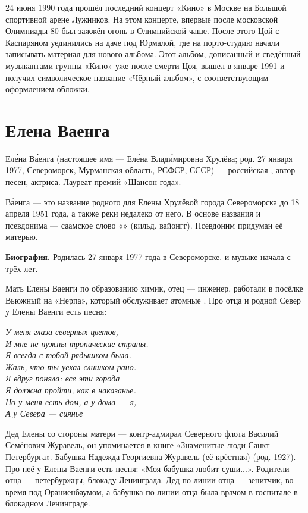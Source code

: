 24 июня 1990 года прошёл последний концерт «Кино» в Москве на Большой спортивной арене Лужников. На этом концерте, впервые после московской Олимпиады-80 был зажжён огонь в Олимпийской чаше. После этого Цой с Каспаряном уединились на даче под Юрмалой, где на порто-студию начали записывать материал для нового альбома. Этот альбом, дописанный и сведённый музыкантами группы «Кино» уже после смерти Цоя, вышел в январе 1991 и получил символическое название «Чёрный альбом», с соответствующим оформлением обложки.

\newpage
\section{Елена Ваенга}
Ел\'{е}на В\'{а}енга (настоящее имя --- Ел\'{е}на Влад\'{и}мировна Хрулёва; род. 27 января 1977, Североморск, Мурманская область, РСФСР, СССР) --- российская , автор песен, актриса. Лауреат премий «Шансон года».

В\'{а}енга --- это название родного для Елены Хрулёвой города Североморска до 18 апреля 1951 года, а также реки недалеко от него. В основе названия и псевдонима --- саамское слово «» (кильд. вайонгг). Псевдоним придуман её матерью.

\textbf{Биография.} Родилась 27 января 1977 года в Североморске.  и  музыке начала с трёх лет.

Мать Елены Ваенги по образованию химик, отец --- инженер, работали в посёлке Вьюжный на  «Нерпа», который обслуживает атомные . Про отца и родной Север у Елены Ваенги есть песня:

{\it У меня глаза северных цветов,\\
И мне не нужны тропические страны.\\
Я всегда с тобой рядышком была.\\
Жаль, что ты уехал слишком рано.\\
Я вдруг поняла: все эти города\\
Я должна пройти, как в наказанье.\\
Но у меня есть дом, а у дома --- я,\\
А у Севера --- сиянье}

Дед Елены со стороны матери --- контр-адмирал Северного флота Василий Семёнович Журавель, он упоминается в книге «Знаменитые люди Санкт-Петербурга». Бабушка Надежда Георгиевна Журавель (её крёстная) (род. 1927). Про неё у Елены Ваенги есть песня: «Моя бабушка любит суши...». Родители отца ---  петербуржцы,  блокаду Ленинграда. Дед по линии отца --- зенитчик, во время   под Ораниенбаумом, а бабушка по линии отца была врачом в госпитале в блокадном Ленинграде.

